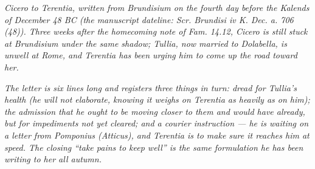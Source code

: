 
\textit{Cicero to Terentia, written from Brundisium on the
fourth day before the Kalends of December 48 BC (the
manuscript dateline: \textit{Scr. Brundisi iv K. Dec.
a. 706 (48)}). Three weeks after the homecoming note of
\textit{Fam.} 14.12, Cicero is still stuck at Brundisium
under the same shadow; Tullia, now married to Dolabella,
is unwell at Rome, and Terentia has been urging him to
come up the road toward her.}

\textit{The letter is six lines long and registers three
things in turn: dread for Tullia's health (he will not
elaborate, knowing it weighs on Terentia as heavily as on
him); the admission that he ought to be moving closer to
them and would have already, but for impediments not yet
cleared; and a courier instruction --- he is waiting on a
letter from Pomponius (Atticus), and Terentia is to make
sure it reaches him at speed. The closing ``take pains to
keep well'' is the same formulation he has been writing to
her all autumn.}

